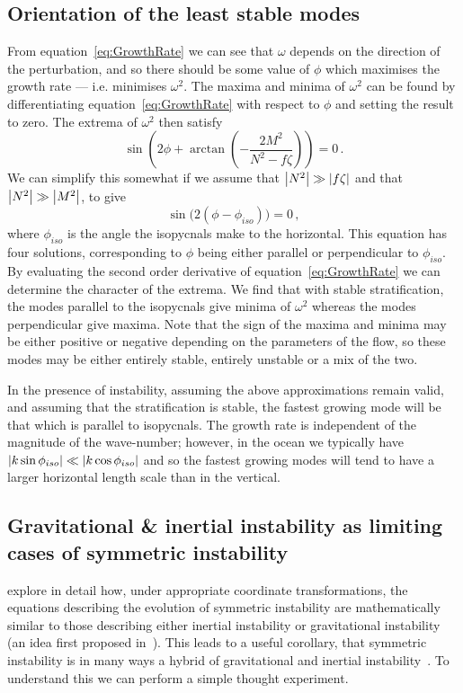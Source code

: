     \subsection{Orientation of the least stable modes}
    From equation~\ref{eq:GrowthRate} we can see that $\omega$ depends on the direction of the perturbation, and so there should be some value of $\phi$ which maximises the growth rate --- i.e. minimises $\omega^2$. The maxima and minima of $\omega^2$ can be found by differentiating equation~\ref{eq:GrowthRate} with respect to $\phi$ and setting the result to zero. The extrema of $\omega^2$ then satisfy
    \begin{equation}
        \sin(2 \phi + \arctan(-\frac{2M^2}{N^2 - f \zeta})) = 0 \, .
    \end{equation}
    We can simplify this somewhat if we assume that $\abs{N^2} \gg \abs{f \zeta}$ and that $\abs{N^2} \gg \abs{M^2}$, to give
    \begin{equation}
        \label{eq:UnstableDirections}
        \sin\big(2(\phi - \phi_{iso})\big) = 0 \, ,
    \end{equation}
    where $\phi_{iso}$ is the angle the isopycnals make to the horizontal. This equation has four solutions, corresponding to $\phi$ being either parallel or perpendicular to $\phi_{iso}$. By evaluating the second order derivative of equation~\ref{eq:GrowthRate} we can determine the character of the extrema. We find that with stable stratification, the modes parallel to the isopycnals give minima of $\omega^2$ whereas the modes perpendicular give maxima. Note that the sign of the maxima and minima may be either positive or negative depending on the parameters of the flow, so these modes may be either entirely stable, entirely unstable or a mix of the two.

    In the presence of instability, assuming the above approximations remain valid, and assuming that the stratification is stable, the fastest growing mode will be that which is parallel to isopycnals. The growth rate is independent of the magnitude of the wave-number; however, in the ocean we typically have $\abs{k \sin\phi_{iso}} \ll \abs{k \cos\phi_{iso}}$ and so the fastest growing modes will tend to have a larger horizontal length scale than in the vertical.

    \subsection{Gravitational \& inertial instability as limiting cases of symmetric instability}
    \citet{Xu1985} explore in detail how, under appropriate coordinate transformations, the equations describing the evolution of symmetric instability are mathematically similar to those describing either inertial instability or gravitational instability (an idea first proposed in~\citet{Hoskins1974}). This leads to a useful corollary, that symmetric instability is in many ways a hybrid of gravitational and inertial instability~\citep[e.g.][]{Haine1998}. To understand this we can perform a simple thought experiment.

